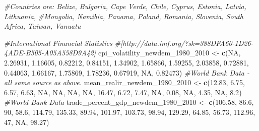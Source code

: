 \documentclass[]{article}
\newenvironment{Shaded}{\begin{snugshade}}{\end{snugshade}}
\newcommand{\CommentTok}[1]{\textcolor[rgb]{0.56,0.35,0.01}{\textit{#1}}}
\newcommand{\DecValTok}[1]{\textcolor[rgb]{0.00,0.00,0.81}{#1}}
\newcommand{\FloatTok}[1]{\textcolor[rgb]{0.00,0.00,0.81}{#1}}
\newcommand{\KeywordTok}[1]{\textcolor[rgb]{0.13,0.29,0.53}{\textbf{#1}}}
\newcommand{\NormalTok}[1]{#1}
\newcommand{\OtherTok}[1]{\textcolor[rgb]{0.56,0.35,0.01}{#1}}
\newcommand{\StringTok}[1]{\textcolor[rgb]{0.31,0.60,0.02}{#1}}
\begin{document}
\begin{Shaded}
\begin{Highlighting}[]
\CommentTok{#Countries are: Belize, Bulgaria, Cape Verde, Chile, Cyprus, Estonia, Latvia, Lithuania,}
\CommentTok{#Mongolia, Namibia, Panama, Poland, Romania, Slovenia, South Africa, Taiwan, Vanuatu}

\CommentTok{#International Financial Statistics}
\CommentTok{#[http://data.imf.org/?sk=388DFA60-1D26-4ADE-B505-A05A558D9A42]}
\NormalTok{cpi_volatility_newdem_}\DecValTok{1980}\NormalTok{_}\DecValTok{2010}\NormalTok{ <-}\StringTok{ }\KeywordTok{c}\NormalTok{(}\OtherTok{NA}\NormalTok{, }\FloatTok{2.26931}\NormalTok{, }\FloatTok{1.16605}\NormalTok{, }\FloatTok{0.82212}\NormalTok{, }\FloatTok{0.84151}\NormalTok{, }\FloatTok{1.34902}\NormalTok{,}
                                     \FloatTok{1.65866}\NormalTok{, }\FloatTok{1.59255}\NormalTok{, }\FloatTok{2.03858}\NormalTok{, }\FloatTok{0.72881}\NormalTok{, }\FloatTok{0.44063}\NormalTok{, }\FloatTok{1.66167}\NormalTok{,}
                                     \FloatTok{1.75869}\NormalTok{, }\FloatTok{1.78236}\NormalTok{, }\FloatTok{0.67919}\NormalTok{, }\OtherTok{NA}\NormalTok{, }\FloatTok{0.82473}\NormalTok{)}
\CommentTok{#World Bank Data - all same source as above.}
\NormalTok{mean_realir_newdem_}\DecValTok{1980}\NormalTok{_}\DecValTok{2010}\NormalTok{ <-}\StringTok{ }\KeywordTok{c}\NormalTok{(}\FloatTok{12.83}\NormalTok{, }\FloatTok{6.75}\NormalTok{, }\FloatTok{6.57}\NormalTok{, }\FloatTok{6.63}\NormalTok{, }\OtherTok{NA}\NormalTok{, }\OtherTok{NA}\NormalTok{, }\OtherTok{NA}\NormalTok{, }\OtherTok{NA}\NormalTok{, }\FloatTok{16.47}\NormalTok{, }\FloatTok{6.72}\NormalTok{,}
                                  \FloatTok{7.47}\NormalTok{, }\OtherTok{NA}\NormalTok{, }\FloatTok{0.08}\NormalTok{, }\OtherTok{NA}\NormalTok{, }\FloatTok{4.35}\NormalTok{, }\OtherTok{NA}\NormalTok{, }\FloatTok{8.2}\NormalTok{)}
\CommentTok{#World Bank Data}
\NormalTok{trade_percent_gdp_newdem_}\DecValTok{1980}\NormalTok{_}\DecValTok{2010}\NormalTok{ <-}\StringTok{ }\KeywordTok{c}\NormalTok{(}\FloatTok{106.58}\NormalTok{, }\FloatTok{86.6}\NormalTok{, }\DecValTok{90}\NormalTok{, }\FloatTok{58.6}\NormalTok{, }\FloatTok{114.79}\NormalTok{, }\FloatTok{135.33}\NormalTok{, }\FloatTok{89.94}\NormalTok{, }
                                        \FloatTok{101.97}\NormalTok{, }\FloatTok{103.73}\NormalTok{, }\FloatTok{98.94}\NormalTok{, }\FloatTok{129.29}\NormalTok{, }\FloatTok{64.85}\NormalTok{, }\FloatTok{56.73}\NormalTok{,}
                                        \FloatTok{112.96}\NormalTok{, }\DecValTok{47}\NormalTok{, }\OtherTok{NA}\NormalTok{, }\FloatTok{98.27}\NormalTok{)}

\end{Highlighting}
\end{Shaded}
\end{document}
